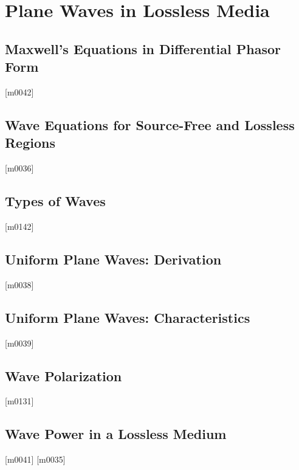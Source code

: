 \documentclass[10pt,letterpaper,twocolumn,openany]{book}
\theoremstyle{definition} %
\begin{document}
  \chapter{Plane Waves in Lossless Media}
  \thispagestyle{fancy} %
  \fancyhf{}            %
    \section{Maxwell's Equations in Differential Phasor Form}
{\color{blue}\tiny[m0042]}      
      \vfill\break
    \section{Wave Equations for Source-Free and Lossless Regions}
{\color{blue}\tiny[m0036]}      
      \vfill\break
    \section{Types of Waves}
{\color{blue}\tiny[m0142]}      
      \vfill\break
    \section{Uniform Plane Waves: Derivation}
{\color{blue}\tiny[m0038]}      
      \vfill\break
    \section{Uniform Plane Waves: Characteristics}
{\color{blue}\tiny[m0039]}      
      \vfill\break
    \section{Wave Polarization}
{\color{blue}\tiny[m0131]}      
      \vfill\break
    \section{Wave Power in a Lossless Medium}
{\color{blue}\tiny[m0041]}      
{\color{blue}\tiny[m0035]}    
\appendix
\end{document}
